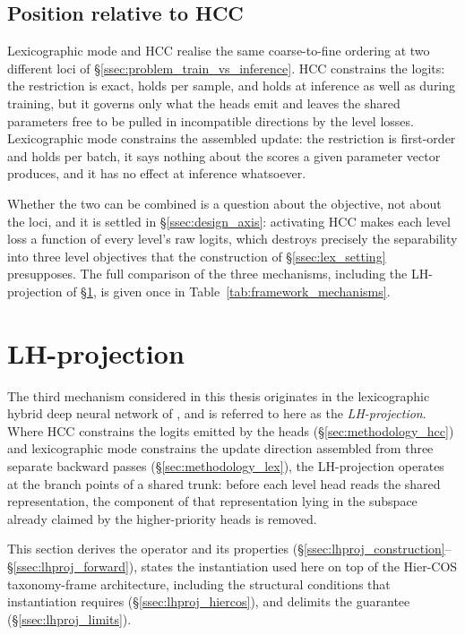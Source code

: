 \subsection{Position relative to HCC}
\label{ssec:lex_vs_hcc}

Lexicographic mode and HCC realise the same coarse-to-fine ordering at two different loci of
\S\ref{ssec:problem_train_vs_inference}. HCC constrains the logits: the restriction is exact,
holds per sample, and holds at inference as well as during training, but it governs only what
the heads emit and leaves the shared parameters free to be pulled in incompatible directions by
the level losses. Lexicographic mode constrains the assembled update: the restriction is
first-order and holds per batch, it says nothing about the scores a given parameter vector
produces, and it has no effect at inference whatsoever.

Whether the two can be combined is a question about the objective, not about the loci, and it is
settled in \S\ref{ssec:design_axis}: activating HCC makes each level loss a function of every
level's raw logits, which destroys precisely the separability into three level objectives that
the construction of \S\ref{ssec:lex_setting} presupposes. The full comparison of the three
mechanisms, including the LH-projection of \S\ref{sec:methodology_lhproj}, is given once in
Table~\ref{tab:framework_mechanisms}.


\section{LH-projection}
\label{sec:methodology_lhproj}

The third mechanism considered in this thesis originates in the lexicographic
hybrid deep neural network of \cite{fiaschi2024informed}, and is referred to here
as the \emph{LH-projection}. Where HCC constrains the logits emitted by the heads
(\S\ref{sec:methodology_hcc}) and lexicographic mode constrains the update
direction assembled from three separate backward passes
(\S\ref{sec:methodology_lex}), the LH-projection operates at the branch points of
a shared trunk: before each level head reads the shared representation, the
component of that representation lying in the subspace already claimed by the
higher-priority heads is removed.

This section derives the operator and its properties
(\S\ref{ssec:lhproj_construction}--\S\ref{ssec:lhproj_forward}), states the
instantiation used here on top of the Hier-COS taxonomy-frame architecture,
including the structural conditions that instantiation requires
(\S\ref{ssec:lhproj_hiercos}), and delimits the guarantee
(\S\ref{ssec:lhproj_limits}).

